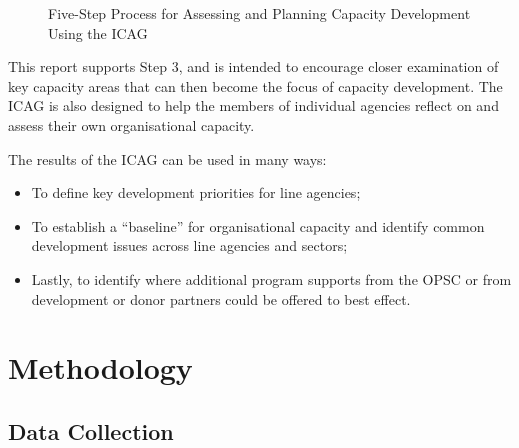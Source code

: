 \documentclass[
  10pt,
]{report}
\providecommand{\tightlist}{%
  \setlength{\itemsep}{0pt}\setlength{\parskip}{0pt}}
\begin{document}
\begin{figure}[H]


\caption{\label{fig-five-steps-assessing-planning-capacity-development}Five-Step
Process for Assessing and Planning Capacity Development Using the ICAG}

\end{figure}%

This report supports Step 3, and is intended to encourage closer
examination of key capacity areas that can then become the focus of
capacity development. The ICAG is also designed to help the members of
individual agencies reflect on and assess their own organisational
capacity.

The results of the ICAG can be used in many ways:

\begin{itemize}
\tightlist
\item
  To define key development priorities for line agencies;
\item
  To establish a ``baseline'' for organisational capacity and identify
  common development issues across line agencies and sectors;
\item
  Lastly, to identify where additional program supports from the OPSC or
  from development or donor partners could be offered to best effect.
\end{itemize}

\section{Methodology}\label{methodology}

\subsection{Data Collection}\label{data-collection}
\end{document}
